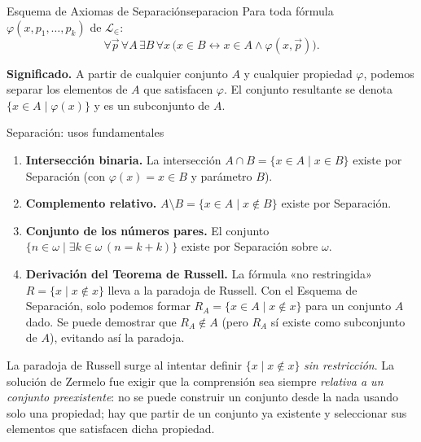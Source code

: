 \begin{definicion}{Esquema de Axiomas de Separación}{separacion}
Para toda fórmula $\varphi(x, p_1, \ldots, p_k)$ de $\mathcal{L}_{\in}$:
\[
  \forall \vec{p}\,\forall A\,\exists B\,\forall x\,\bigl(x \in B \leftrightarrow x \in A \wedge \varphi(x, \vec{p})\bigr).
\]
\end{definicion}

\textbf{Significado.} A partir de cualquier conjunto $A$ y cualquier propiedad $\varphi$, podemos separar los elementos de $A$ que satisfacen $\varphi$. El conjunto resultante se denota $\{x \in A \mid \varphi(x)\}$ y es un subconjunto de $A$.

\begin{ejemplo}{Separación: usos fundamentales}{}
\begin{enumerate}[leftmargin=2em, label=(\alph*)]
  \item \textbf{Intersección binaria.} La intersección $A \cap B = \{x \in A \mid x \in B\}$ existe por Separación (con $\varphi(x) = x \in B$ y parámetro $B$).

  \item \textbf{Complemento relativo.} $A \setminus B = \{x \in A \mid x \notin B\}$ existe por Separación.

  \item \textbf{Conjunto de los números pares.} El conjunto $\{n \in \omega \mid \exists k \in \omega\,(n = k+k)\}$ existe por Separación sobre $\omega$.

  \item \textbf{Derivación del Teorema de Russell.} La fórmula «no restringida» $R = \{x \mid x \notin x\}$ lleva a la paradoja de Russell. Con el Esquema de Separación, solo podemos formar $R_A = \{x \in A \mid x \notin x\}$ para un conjunto $A$ dado. Se puede demostrar que $R_A \notin A$ (pero $R_A$ sí existe como subconjunto de $A$), evitando así la paradoja.
\end{enumerate}
\end{ejemplo}

\begin{importante}
La paradoja de Russell surge al intentar definir $\{x \mid x \notin x\}$ \emph{sin restricción}. La solución de Zermelo fue exigir que la comprensión sea siempre \emph{relativa a un conjunto preexistente}: no se puede construir un conjunto desde la nada usando solo una propiedad; hay que partir de un conjunto ya existente y seleccionar sus elementos que satisfacen dicha propiedad.
\end{importante}

